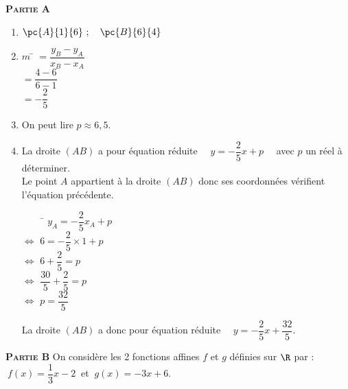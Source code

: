 \documentclass[a4paper,11pt,exos]{nsi} %
\begin{document}
\exo{}
\textbf{\textsc{Partie A}}
	\begin{enumerate}
		\item 	$\pc{A}{1}{6}\ ; \quad \pc{B}{6}{4}$
		\item 	\begin{tabbing}
            $m$ \=  $=\dfrac{y_B-y_A}{x_B-x_A}$\\[.5em]
                \>  $=\dfrac{4-6}{6-1}$\\[.5em]
                \>  $=-\dfrac{2}{5}$
        \end{tabbing}
		\item 	On peut lire $p\approx 6,5$.
		\item 	La droite $(AB)$ a pour équation réduite $\quad y=-\dfrac{2}{5}x+p \quad$ avec $p$ un réel à déterminer.\\
		Le point $A$ appartient à la droite $(AB)$ donc ses coordonnées vérifient l'équation précédente.
        \begin{tabbing}
            $\qquad$    \=  $y_A=-\dfrac{2}{5}x_A+p$\\[.5em]
            $\Longleftrightarrow$   \>  $6=-\dfrac{2}{5}\times 1+p$\\[.5em]
            $\Longleftrightarrow$   \>  $6+\dfrac{2}{5}=p$\\[.5em]
            $\Longleftrightarrow$   \>  $\dfrac{30}{5}+\dfrac{2}{5}=p$\\[.5em]
            $\Longleftrightarrow$   \>  $p=\dfrac{32}{5}$
        \end{tabbing}
        La droite $(AB)$ a donc pour équation réduite $\quad y=-\dfrac{2}{5}x+\dfrac{32}{5}$.
	\end{enumerate}



	\textbf{\textsc{Partie B}}
	On considère les 2 fonctions affines $f$ et $g$ définies sur $\R$ par : $\ f(x)=\dfrac{1}{3}x-2\ $ et $\ g(x)=-3x+6$.
	
\end{document}
